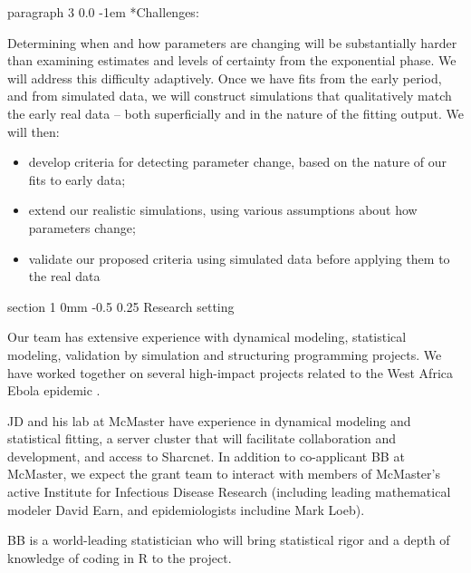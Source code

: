 \documentclass[12pt]{article}
\makeatletter
\renewcommand{\section}{\@startsection  %
{section}%
{1}%
{0mm}%
{-0.5\baselineskip}%
{0.25\baselineskip}%
{\normalfont\Large\bfseries}}%
\renewcommand{\paragraph}{\vspace{0.40ex \@plus 0.2ex \@minus 0.0ex}\@startsection%
{paragraph}%
{3}%
{\parindent}%
{0.0\baselineskip}%
{-1em}%
{\normalfont\normalsize\bfseries}}%
\makeatother
\begin{document}
\paragraph*{Challenges:}

Determining when and how parameters are changing will be substantially harder than examining estimates and levels of certainty from the exponential phase. We will address this difficulty adaptively. Once we have fits from the early period, and from simulated data, we will construct simulations that qualitatively match the early real data -- both superficially and in the nature of the fitting output. We will then:

\begin{itemize}

\item develop criteria for detecting parameter change, based on the nature of our fits to early data;

\item extend our realistic simulations, using various assumptions about how parameters change;

\item validate our proposed criteria using simulated data before applying them to the real data

\end{itemize}

\section{Research setting}

Our team has extensive experience with dynamical modeling, statistical modeling, validation by simulation and structuring programming projects. We have worked together on several high-impact projects related to the West Africa Ebola epidemic \cite{BellPull14Asymp,Bellan2014, BellPull15}.

JD and his lab at McMaster have experience in dynamical modeling and statistical fitting, a server cluster that will facilitate collaboration and development, and access to Sharcnet. In addition to co-applicant BB at McMaster, we expect the grant team to interact with members of McMaster's active Institute for Infectious Disease Research (including leading mathematical modeler David Earn, and epidemiologists includine Mark Loeb).

BB is a world-leading statistician who will bring statistical rigor and a depth of knowledge of coding in R to the project.
\end{document}

